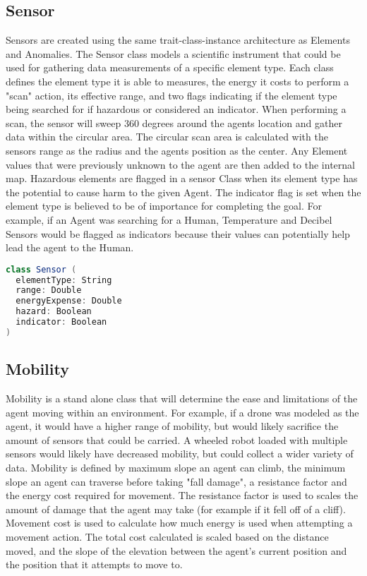 \subsection{Sensor}
Sensors are created using the same trait-class-instance architecture as Elements and Anomalies.
The Sensor class models a scientific instrument that could be used for gathering data measurements of a specific element type.
Each class defines the element type it is able to measures, the energy it costs to perform a "scan" action, its effective range, and two flags indicating if the element type being searched for if hazardous or considered an indicator.
When performing a scan, the sensor will sweep 360 degrees around the agents location and gather data within the circular area.
The circular scan area is calculated with the sensors range as the radius and the agents position as the center.
Any Element values that were previously unknown to the agent are then added to the internal map.
Hazardous elements are flagged in a sensor Class when its element type has the potential to cause harm to the given Agent.
The indicator flag is set when the element type is believed to be of importance for completing the goal.
For example, if an Agent was searching for a Human, Temperature and Decibel Sensors would be flagged as indicators because their values can potentially help lead the agent to the Human.

\begin{lstlisting}[language=Scala]
class Sensor (
  elementType: String
  range: Double
  energyExpense: Double
  hazard: Boolean
  indicator: Boolean
)
\end{lstlisting}


\subsection{Mobility}
Mobility is a stand alone class that will determine the ease and limitations of the agent moving within an environment.
For example, if a drone was modeled as the agent, it would have a higher range of mobility, but would likely sacrifice the amount of sensors that could be carried.
A wheeled robot loaded with multiple sensors would likely have decreased mobility, but could collect a wider variety of data.
Mobility is defined by maximum slope an agent can climb, the minimum slope an agent can traverse before taking "fall damage", a resistance factor and the energy cost required for movement.
The resistance factor is used to scales the amount of damage that the agent may take (for example if it fell off of a cliff).
Movement cost is used to calculate how much energy is used when attempting a movement action.
The total cost calculated is scaled based on the distance moved, and the slope of the elevation between the agent's current position and the position that it attempts to move to.


